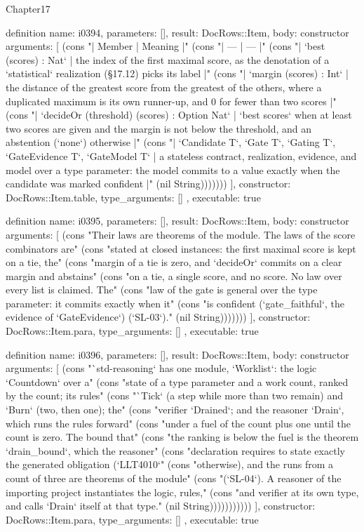 \begin{lexlean}{Chapter17}
\begin{semanticmodule}
definition{
  name: i0394,
  parameters: [],
  result: DocRows::Item,
  body: constructor{
    arguments: [
      (cons "| Member | Meaning |" (cons "| --- | --- |" (cons "| `best (scores) : Nat` | the index of the first maximal score, as the denotation of a `statistical` realization (§17.12) picks its label |" (cons "| `margin (scores) : Int` | the distance of the greatest score from the greatest of the others, where a duplicated maximum is its own runner-up, and 0 for fewer than two scores |" (cons "| `decideOr (threshold) (scores) : Option Nat` | `best scores` when at least two scores are given and the margin is not below the threshold, and an abstention (`none`) otherwise |" (cons "| `Candidate T`, `Gate T`, `Gating T`, `GateEvidence T`, `GateModel T` | a stateless contract, realization, evidence, and model over a type parameter: the model commits to a value exactly when the candidate was marked confident |" (nil String)))))))
    ],
    constructor: DocRows::Item.table,
    type_arguments: []
  },
  executable: true
}

definition{
  name: i0395,
  parameters: [],
  result: DocRows::Item,
  body: constructor{
    arguments: [
      (cons "Their laws are theorems of the module. The laws of the score combinators are" (cons "stated at closed instances: the first maximal score is kept on a tie, the" (cons "margin of a tie is zero, and `decideOr` commits on a clear margin and abstains" (cons "on a tie, a single score, and no score. No law over every list is claimed. The" (cons "law of the gate is general over the type parameter: it commits exactly when it" (cons "is confident (`gate_faithful`, the evidence of `GateEvidence`) (`SL-03`)." (nil String)))))))
    ],
    constructor: DocRows::Item.para,
    type_arguments: []
  },
  executable: true
}

definition{
  name: i0396,
  parameters: [],
  result: DocRows::Item,
  body: constructor{
    arguments: [
      (cons "`std-reasoning` has one module, `Worklist`: the logic `Countdown` over a" (cons "state of a type parameter and a work count, ranked by the count; its rules" (cons "`Tick` (a step while more than two remain) and `Burn` (two, then one); the" (cons "verifier `Drained`; and the reasoner `Drain`, which runs the rules forward" (cons "under a fuel of the count plus one until the count is zero. The bound that" (cons "the ranking is below the fuel is the theorem `drain_bound`, which the reasoner" (cons "declaration requires to state exactly the generated obligation (`LLT4010`" (cons "otherwise), and the runs from a count of three are theorems of the module" (cons "(`SL-04`). A reasoner of the importing project instantiates the logic, rules," (cons "and verifier at its own type, and calls `Drain` itself at that type." (nil String)))))))))))
    ],
    constructor: DocRows::Item.para,
    type_arguments: []
  },
  executable: true
}


\end{semanticmodule}
\end{lexlean}
